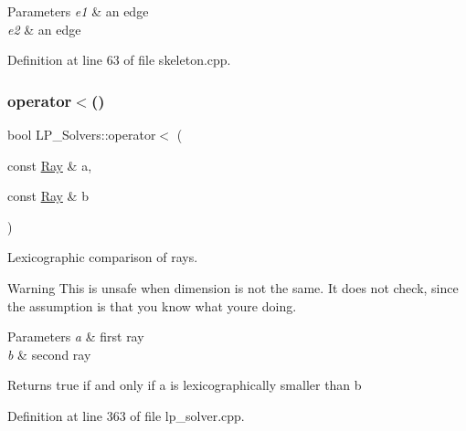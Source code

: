 \begin{DoxyParams}{Parameters}
{\em e1} & an edge \\
\hline
{\em e2} & an edge \\
\hline
\end{DoxyParams}


Definition at line 63 of file skeleton.\+cpp.

\mbox{\label{namespace_l_p___solvers_a28498e1aa874114a1ae27876d309b0d1}} 
\subsubsection{\texorpdfstring{operator$<$()}{operator<()}\hspace{0.1cm}{\footnotesize\ttfamily [3/3]}}
{\footnotesize\ttfamily bool L\+P\+\_\+\+Solvers\+::operator$<$ (\begin{DoxyParamCaption}\item[{const \hyperlink{group___c_l_s_solvers_class_l_p___solvers_1_1_ray}{Ray} \&}]{a,  }\item[{const \hyperlink{group___c_l_s_solvers_class_l_p___solvers_1_1_ray}{Ray} \&}]{b }\end{DoxyParamCaption})}



Lexicographic comparison of rays. 

\begin{DoxyWarning}{Warning}
This is unsafe when dimension is not the same. It does not check, since the assumption is that you know what you\textquotesingle{}re doing. 
\end{DoxyWarning}

\begin{DoxyParams}{Parameters}
{\em a} & first ray \\
\hline
{\em b} & second ray \\
\hline
\end{DoxyParams}
\begin{DoxyReturn}{Returns}
{\ttfamily true} if and only if {\ttfamily a} is lexicographically smaller than {\ttfamily b} 
\end{DoxyReturn}


Definition at line 363 of file lp\+\_\+solver.\+cpp.

\mbox{\label{namespace_l_p___solvers_a839482d44b36df2b4b70e5ab99662e45}} 
